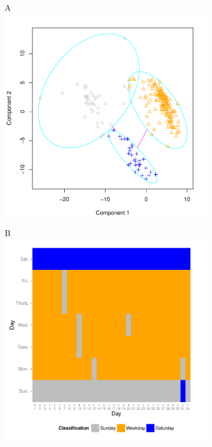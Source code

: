 \documentclass{report}
\begin{document}
\begin{figure}[H]
\centering
\begin{subfigure}[b]{0.45\textwidth}
\centering
A\\
\includegraphics{upstat_report-clustering}
\end{subfigure}
\begin{subfigure}[b]{0.45\textwidth}
\centering
B\\
\includegraphics{upstat_report-007}

\end{subfigure}
\end{figure}
\end{document}
